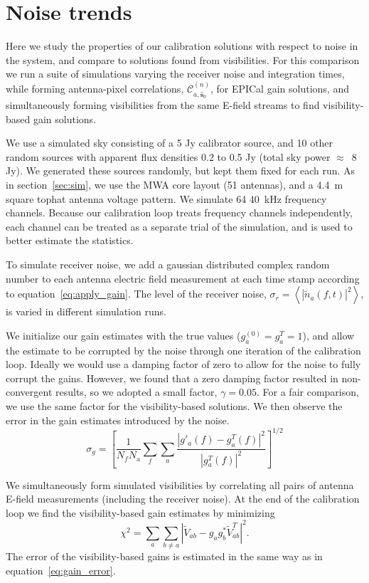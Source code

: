 \documentclass[a4paper,fleqn,usenatbib]{../mnras}
\newcommand{\Nant}{\ensuremath{N_{\mathrm{a}}}}
\newcommand{\spix}{\ensuremath{\hat{\mathbf{s}}_{0}}}
\newcommand{\Cna}[1][n]{\ensuremath{\mathcal{C}^{(#1)}_{a,\spix}}}
\newcommand{\V}{\ensuremath{\widetilde{V}}}
\newcommand{\damp}{\ensuremath{\gamma}}
\begin{document}
\section{Noise trends}\label{sec:noise}
Here we study the properties of our calibration solutions with respect to noise in the system, and compare to solutions found from visibilities. For this comparison we run a suite of simulations varying the receiver noise and integration times, while forming antenna-pixel correlations, $\Cna$, for EPICal gain solutions, and simultaneously forming visibilities from the same E-field streams to find visibility-based gain solutions.

We use a simulated sky consisting of a 5 Jy calibrator source, and 10 other random sources with apparent flux densities 0.2 to 0.5 Jy (total sky power $\approx$~8 Jy). We generated these sources randomly, but kept them fixed for each run. As in section~\ref{sec:sim}, we use the MWA core layout (51 antennas), and a 4.4~m square tophat antenna voltage pattern. We simulate 64 40~kHz frequency channels. Because our calibration loop treats frequency channels independently, each channel can be treated as a separate trial of the simulation, and is used to better estimate the statistics.

To simulate receiver noise, we add a gaussian distributed complex random number to each antenna electric field measurement at each time stamp according to equation~\ref{eq:apply_gain}. The level of the receiver noise, $\sigma_r = \left<\left|\widetilde{n}_a(f,t)\right|^2\right>$, is varied in different simulation runs. 

We initialize our gain estimates with the true values (${g^{(0)}_a=g^T_a=1}$), and allow the estimate to be corrupted by the noise through one iteration of the calibration loop. Ideally we would use a damping factor of zero to allow for the noise to fully corrupt the gains. However, we found that a zero damping factor resulted in non-convergent results, so we adopted a small factor, $\damp=0.05$. For a fair comparison, we use the same factor for the visibility-based solutions. We then observe the error in the gain estimates introduced by the noise.
\begin{equation}\label{eq:gain_error}
\sigma_g = \left[\frac{1}{N_f \Nant} \sum_f \sum_a \frac{\left|g'_a(f)-g^T_a(f)\right|^2}{\left|g^T_a(f)\right|^2}\right]^{1/2}
\end{equation}

We simultaneously form simulated visibilities by correlating all pairs of antenna E-field measurements (including the receiver noise). At the end of the calibration loop we find the visibility-based gain estimates by minimizing
\begin{equation}\label{eq:vis_cal}
\chi^2 = \sum_a\sum_{b\ne a} \left|\V_{ab}-g_a g_b^* \V^T_{ab}\right|^2.
\end{equation}
The error of the visibility-based gains is estimated in the same way as in equation~\ref{eq:gain_error}.
\end{document}
